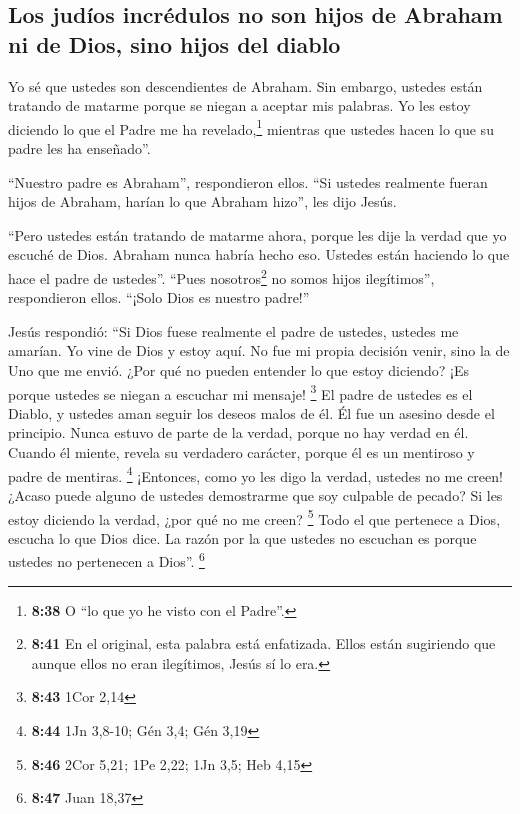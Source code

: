\hypertarget{los-juduxedos-incruxe9dulos-no-son-hijos-de-abraham-ni-de-dios-sino-hijos-del-diablo}{%
\subsection{Los judíos incrédulos no son hijos de Abraham ni de Dios,
sino hijos del
diablo}\label{los-juduxedos-incruxe9dulos-no-son-hijos-de-abraham-ni-de-dios-sino-hijos-del-diablo}}

 Yo sé que ustedes son descendientes de Abraham. Sin
embargo, ustedes están tratando de matarme porque se niegan a aceptar
mis palabras.  Yo les estoy diciendo lo que el Padre me
ha revelado,\footnote{\textbf{8:38} O ``lo que yo he visto con el
  Padre''.} mientras que ustedes hacen lo que su padre les ha
enseñado''.

 ``Nuestro padre es Abraham'', respondieron ellos. ``Si
ustedes realmente fueran hijos de Abraham, harían lo que Abraham hizo'',
les dijo Jesús.

 ``Pero ustedes están tratando de matarme ahora, porque
les dije la verdad que yo escuché de Dios. Abraham nunca habría hecho
eso.  Ustedes están haciendo lo que hace el padre de
ustedes''. ``Pues nosotros\footnote{\textbf{8:41} En el original, esta
  palabra está enfatizada. Ellos están sugiriendo que aunque ellos no
  eran ilegítimos, Jesús sí lo era.} no somos hijos ilegítimos'',
respondieron ellos. ``¡Solo Dios es nuestro padre!''

 Jesús respondió: ``Si Dios fuese realmente el padre de
ustedes, ustedes me amarían. Yo vine de Dios y estoy aquí. No fue mi
propia decisión venir, sino la de Uno que me envió.  ¿Por
qué no pueden entender lo que estoy diciendo? ¡Es porque ustedes se
niegan a escuchar mi mensaje! \footnote{\textbf{8:43} 1Cor 2,14}
 El padre de ustedes es el Diablo, y ustedes aman seguir
los deseos malos de él. Él fue un asesino desde el principio. Nunca
estuvo de parte de la verdad, porque no hay verdad en él. Cuando él
miente, revela su verdadero carácter, porque él es un mentiroso y padre
de mentiras. \footnote{\textbf{8:44} 1Jn 3,8-10; Gén 3,4; Gén 3,19}
 ¡Entonces, como yo les digo la verdad, ustedes no me
creen!  ¿Acaso puede alguno de ustedes demostrarme que
soy culpable de pecado? Si les estoy diciendo la verdad, ¿por qué no me
creen? \footnote{\textbf{8:46} 2Cor 5,21; 1Pe 2,22; 1Jn 3,5; Heb 4,15}
 Todo el que pertenece a Dios, escucha lo que Dios dice.
La razón por la que ustedes no escuchan es porque ustedes no pertenecen
a Dios''. \footnote{\textbf{8:47} Juan 18,37}


